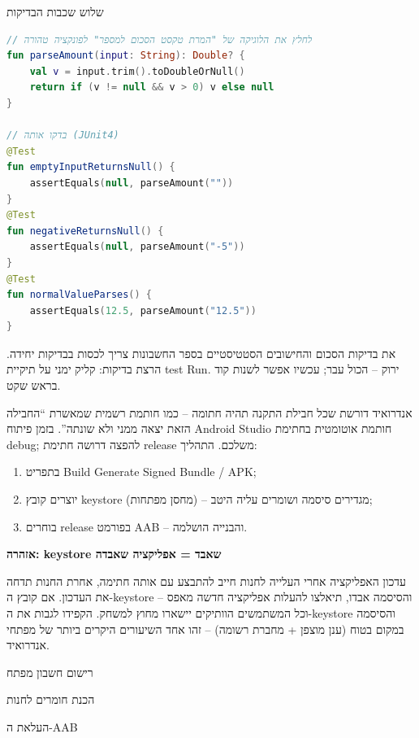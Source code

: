 \begin{center}\small\color{gray}שלוש שכבות הבדיקות\end{center}

\begin{lstlisting}[language=Kotlin]
// לחלץ את הלוגיקה של "המרת טקסט הסכום למספר" לפונקציה טהורה
fun parseAmount(input: String): Double? {
    val v = input.trim().toDoubleOrNull()
    return if (v != null && v > 0) v else null
}

// בדקו אותה (JUnit4)
@Test
fun emptyInputReturnsNull() {
    assertEquals(null, parseAmount(""))
}
@Test
fun negativeReturnsNull() {
    assertEquals(null, parseAmount("-5"))
}
@Test
fun normalValueParses() {
    assertEquals(12.5, parseAmount("12.5"))
}
\end{lstlisting}

את בדיקות הסכום והחישובים הסטטיסטיים בספר החשבונות צריך לכסות בבדיקות יחידה. הרצת בדיקות: קליק ימני על תיקיית test Run. ירוק – הכול עבר; עכשיו אפשר לשנות קוד בראש שקט.


אנדרואיד דורשת שכל חבילת התקנה תהיה חתומה – כמו חותמת רשמית שמאשרת “החבילה הזאת יצאה ממני ולא שונתה”. בזמן פיתוח Android Studio חותמת אוטומטית בחתימת debug; להפצה דרושה חתימת release משלכם. התהליך:

\begin{enumerate}
  \item בתפריט Build Generate Signed Bundle / APK;
  \item יוצרים קובץ keystore (מחסן מפתחות) – מגדירים סיסמה ושומרים עליה היטב;
  \item בוחרים release בפורמט AAB – והבנייה הושלמה.
\end{enumerate}

\textbf{אזהרה: keystore שאבד = אפליקציה שאבדה}\par

עדכון האפליקציה אחרי העלייה לחנות חייב להתבצע עם אותה חתימה, אחרת החנות תדחה את העדכון. אם קובץ ה-keystore והסיסמה אבדו, תיאלצו להעלות אפליקציה חדשה מאפס – וכל המשתמשים הוותיקים יישארו מחוץ למשחק. הקפידו לגבות את ה-keystore והסיסמה במקום בטוח (ענן מוצפן + מחברת רשומה) – זהו אחד השיעורים היקרים ביותר של מפתחי אנדרואיד.


רישום חשבון מפתח

הכנת חומרים לחנות

העלאת ה-AAB

